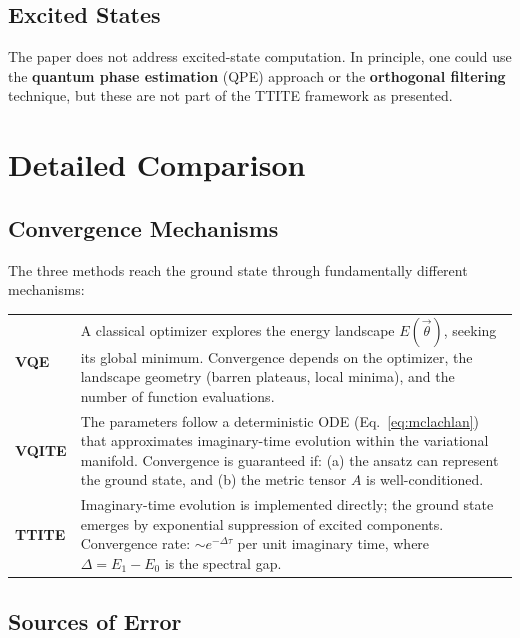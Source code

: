 \documentclass[11pt,a4paper]{article}
\begin{document}
\subsection{Excited States}

The paper does not address excited-state computation.  In principle, one
could use the \textbf{quantum phase estimation} (QPE) approach or the
\textbf{orthogonal filtering} technique, but these are not part of the TTITE
framework as presented.


\section{Detailed Comparison}
\label{sec:comparison}

\subsection{Convergence Mechanisms}

The three methods reach the ground state through fundamentally different
mechanisms:

\begin{center}
\small
\begin{tabular}{@{}l p{10cm}@{}}
\toprule
\textbf{VQE} & A classical optimizer explores the energy landscape
  $E(\vec\theta)$, seeking its global minimum.  Convergence depends on the
  optimizer, the landscape geometry (barren plateaus, local minima), and the
  number of function evaluations. \\[4pt]
\textbf{VQITE} & The parameters follow a deterministic ODE (Eq.~\ref{eq:mclachlan})
  that approximates imaginary-time evolution within the variational manifold.
  Convergence is guaranteed if: (a) the ansatz can represent the ground state,
  and (b) the metric tensor $A$ is well-conditioned. \\[4pt]
\textbf{TTITE} & Imaginary-time evolution is implemented directly; the
  ground state emerges by exponential suppression of excited components.
  Convergence rate: $\sim e^{-\Delta\tau}$ per unit imaginary time, where
  $\Delta = E_1 - E_0$ is the spectral gap. \\
\bottomrule
\end{tabular}
\end{center}

\subsection{Sources of Error}
\end{document}
